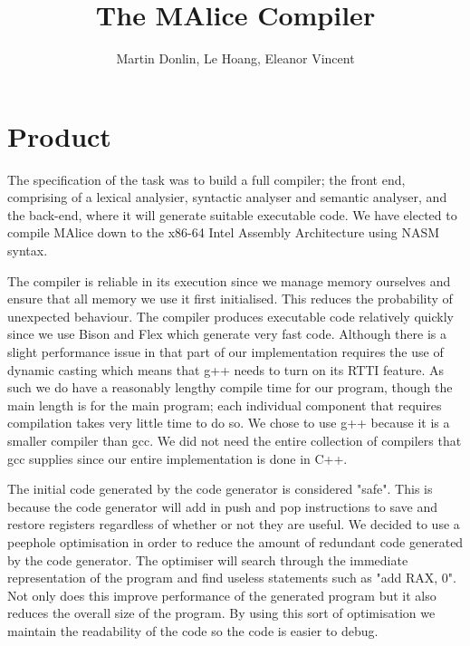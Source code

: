 \documentclass[8pt, a4paper]{article}
\begin{document}
\title{The MAlice Compiler}
\author{Martin Donlin, Le Hoang, Eleanor Vincent}
\maketitle
\small
\section{Product}

The specification of the task was to build a full compiler; the front end, comprising of a lexical analysier, syntactic analyser and semantic analyser, and the back-end, where it will generate suitable executable code. We have elected to compile MAlice down to the x86-64 Intel Assembly Architecture using NASM syntax. 

The compiler is reliable in its execution since we manage memory ourselves and ensure that all memory we use it first initialised. This reduces the probability of unexpected behaviour. The compiler produces executable code relatively quickly since we use Bison and Flex which generate very fast code. Although there is a slight performance issue in that part of our implementation requires the use of dynamic casting which means that g++ needs to turn on its RTTI feature. As such we do have a reasonably lengthy compile time for our program, though the main length is for the main program; each individual component that requires compilation takes very little time to do so. We chose to use g++ because it is a smaller compiler than gcc. We did not need the entire collection of compilers that gcc supplies since our entire implementation is done in C++. 

The initial code generated by the code generator is considered "safe". This is because the code generator will add in push and pop instructions to save and restore registers regardless of whether or not they are useful. We decided to use a peephole optimisation in order to reduce the amount of redundant code generated by the code generator. The optimiser will search through the immediate representation of the program and find useless statements such as "add RAX, 0". Not only does this improve performance of the generated program but it also reduces the overall size of the program. By using this sort of optimisation we maintain the readability of the code so the code is easier to debug.
\end{document}
